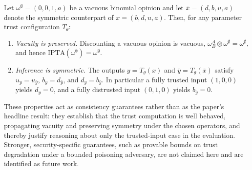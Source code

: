 \begin{theorem}\label{thm:infvac}
Let \(\omega^\emptyset=(0,0,1,a)\) be a vacuous binomial opinion and let \(\bar{x}=(d,b,u,a)\) denote the symmetric counterpart of \(x=(b,d,u,a)\). Then, for any parameter trust configuration \(T_\theta\):
\begin{enumerate}
    \item \emph{Vacuity is preserved.} Discounting a vacuous opinion is vacuous, \(\omega^A_B \otimes \omega^\emptyset = \omega^\emptyset\), and hence \(\mathrm{IPTA}(\omega^\emptyset) = \omega^\emptyset\).
    \item \emph{Inference is symmetric.} The outputs \(y = T_\theta(x)\) and \(\bar y = T_\theta(\bar x)\) satisfy \(u_y = u_{\bar y}\), \(b_y = d_{\bar y}\), and \(d_y = b_{\bar y}\). In particular a fully trusted input \((1,0,0)\) yields \(d_y = 0\), and a fully distrusted input \((0,1,0)\) yields \(b_{\bar y} = 0\).
\end{enumerate}
\end{theorem}

These properties act as consistency guarantees rather than as the paper's headline result: they establish that the trust computation is well behaved, propagating vacuity and preserving symmetry under the chosen operators, and thereby justify reasoning about only the trusted-input case in the evaluation. Stronger, security-specific guarantees, such as provable bounds on trust degradation under a bounded poisoning adversary, are not claimed here and are identified as future work.
